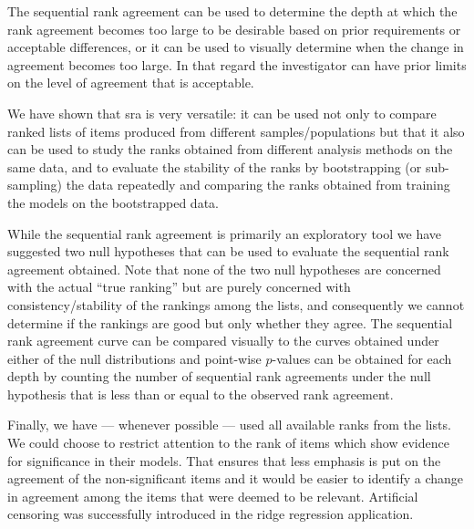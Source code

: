 \documentclass[oupdraft]{bio}
\begin{document}
The sequential rank agreement can be used to determine the depth at
which the rank agreement becomes too large to be desirable based on
prior requirements or acceptable differences, or it can be used to
visually determine when the change in agreement becomes too large.  In
that regard the investigator can have prior limits on the level of
agreement that is acceptable.

We have shown that sra is very versatile: it can be used not only to
compare ranked lists of items produced from different
samples/populations but that it also can be used to study the ranks
obtained from different analysis methods on the same data, and to
evaluate the stability of the ranks by bootstrapping (or sub-sampling)
the data repeatedly and comparing the ranks obtained from training the
models on the bootstrapped data.

While the sequential rank agreement is primarily an exploratory tool
we have suggested two null hypotheses that can be used to evaluate the
sequential rank agreement obtained. Note that none of the two null
hypotheses are concerned with the actual ``true ranking'' but are
purely concerned with consistency/stability of the rankings among the
lists, and consequently we cannot determine if the rankings are good but only
whether they agree. The sequential rank agreement curve can be
compared visually to the curves obtained under either of the null
distributions and point-wise $p$-values can be obtained for
each depth by counting the number of sequential rank agreements under
the null hypothesis that is less than or equal to the observed rank
agreement.

Finally, we have --- whenever possible --- used all available ranks
from the lists.  We could choose to restrict attention to the rank of
items which show evidence for significance in their models. That
ensures that less emphasis is put on the agreement of the
non-significant items and it would be easier to identify a change in
agreement among the items that were deemed to be relevant.  Artificial
censoring was successfully introduced in the ridge regression
application.
\end{document}
